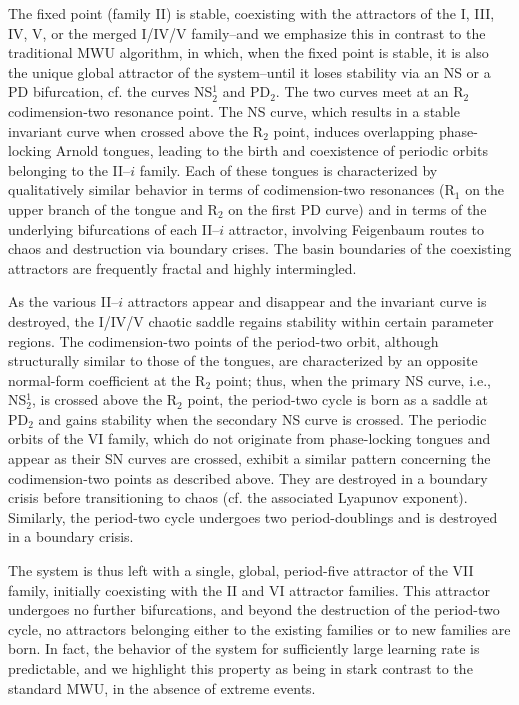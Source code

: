\documentclass{article}
\theoremstyle{plain}
\theoremstyle{definition}
\begin{document}
The fixed point (family II) is stable, coexisting with the attractors of the I, III, IV, V, or the merged I/IV/V family--and we emphasize this in contrast to the traditional MWU algorithm, in which, when the fixed point is stable, it is also the unique global attractor of the system--until it loses stability via an NS or a PD bifurcation, cf. the curves NS$_2^1$ and PD$_2$. The two curves meet at an R$_2$ codimension-two resonance point. The NS curve, which results in a stable invariant curve when crossed above the R$_2$ point, induces overlapping phase-locking Arnold tongues, leading to the birth and coexistence of periodic orbits belonging to the II--$i$ family. Each of these tongues is characterized by qualitatively similar behavior in terms of codimension-two resonances (R$_1$ on the upper branch of the tongue and R$_2$ on the first PD curve) and in terms of the underlying bifurcations of each II--$i$ attractor, involving Feigenbaum routes to chaos and destruction via boundary crises. The basin boundaries of the coexisting attractors are frequently fractal and highly intermingled.

As the various II--$i$ attractors appear and disappear and the invariant curve is destroyed, the I/IV/V chaotic saddle regains stability within certain parameter regions. The codimension-two points of the period-two orbit, although structurally similar to those of the tongues, are characterized by an opposite normal-form coefficient at the R$_2$ point; thus, when the primary NS curve, i.e., NS$_2^1$, is crossed above the R$_2$ point, the period-two cycle is born as a saddle at PD$_2$ and gains stability when the secondary NS curve is crossed. The periodic orbits of the VI family, which do not originate from phase-locking tongues and appear as their SN curves are crossed, exhibit a similar pattern concerning the codimension-two points as described above. They are destroyed in a boundary crisis before transitioning to chaos (cf. the associated Lyapunov exponent). Similarly, the period-two cycle undergoes two period-doublings and is destroyed in a boundary crisis. 

The system is thus left with a single, global, period-five attractor of the VII family, initially coexisting with the II and VI attractor families. This attractor undergoes no further bifurcations, and beyond the destruction of the period-two cycle, no attractors belonging either to the existing families or to new families are born. In fact, the behavior of the system for sufficiently large learning rate is predictable, and we highlight this property as being in stark contrast to the standard MWU, in the absence of extreme events.
\end{document}
